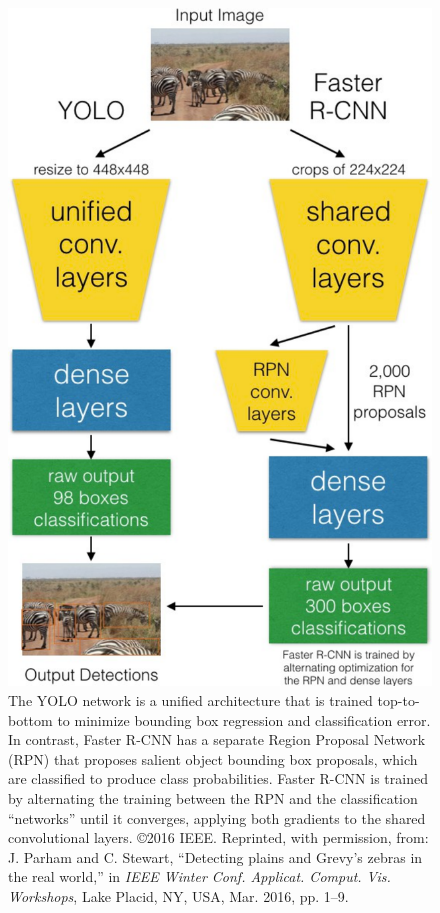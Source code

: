 \begin{figure}[!t]
    \begin{center}
        \includegraphics[width=0.58\linewidth]{resources/comparison.pdf}
    \end{center}
    \caption{The YOLO network is a unified architecture that is trained top-to-bottom to minimize bounding box regression and classification error.  In contrast, Faster R-CNN has a separate Region Proposal Network (RPN) that proposes salient object bounding box proposals, which are classified to produce class probabilities.  Faster R-CNN is trained by alternating the training between the RPN and the classification ``networks'' until it converges, applying both gradients to the shared convolutional layers.  \copyright 2016 IEEE. Reprinted, with permission, from: J. Parham and C. Stewart, ``Detecting plains and Grevy’s zebras in the real world,'' in \textit{IEEE Winter Conf. Applicat. Comput. Vis. Workshops}, Lake Placid, NY, USA, Mar. 2016, pp. 1–9.}
    \label{fig:cnncompare}
\end{figure}

